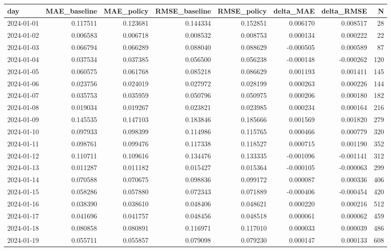 \begin{tabular}{lrrrrrrr}
\toprule
day & MAE_baseline & MAE_policy & RMSE_baseline & RMSE_policy & delta_MAE & delta_RMSE & N \\
\midrule
2024-01-01 & 0.117511 & 0.123681 & 0.144334 & 0.152851 & 0.006170 & 0.008517 & 28 \\
2024-01-02 & 0.006583 & 0.006718 & 0.008532 & 0.008753 & 0.000134 & 0.000222 & 22 \\
2024-01-03 & 0.066794 & 0.066289 & 0.088040 & 0.088629 & -0.000505 & 0.000589 & 87 \\
2024-01-04 & 0.037534 & 0.037385 & 0.056500 & 0.056238 & -0.000148 & -0.000262 & 120 \\
2024-01-05 & 0.060575 & 0.061768 & 0.085218 & 0.086629 & 0.001193 & 0.001411 & 145 \\
2024-01-06 & 0.023756 & 0.024019 & 0.027972 & 0.028199 & 0.000263 & 0.000226 & 144 \\
2024-01-07 & 0.035753 & 0.035959 & 0.050796 & 0.050975 & 0.000206 & 0.000180 & 182 \\
2024-01-08 & 0.019034 & 0.019267 & 0.023821 & 0.023985 & 0.000234 & 0.000164 & 216 \\
2024-01-09 & 0.145535 & 0.147103 & 0.183846 & 0.185666 & 0.001569 & 0.001820 & 279 \\
2024-01-10 & 0.097933 & 0.098399 & 0.114986 & 0.115765 & 0.000466 & 0.000779 & 320 \\
2024-01-11 & 0.098761 & 0.099476 & 0.117338 & 0.118527 & 0.000715 & 0.001190 & 352 \\
2024-01-12 & 0.110711 & 0.109616 & 0.134476 & 0.133335 & -0.001096 & -0.001141 & 312 \\
2024-01-13 & 0.011287 & 0.011182 & 0.015427 & 0.015364 & -0.000105 & -0.000063 & 299 \\
2024-01-14 & 0.070588 & 0.070675 & 0.098836 & 0.099172 & 0.000087 & 0.000336 & 406 \\
2024-01-15 & 0.058286 & 0.057880 & 0.072343 & 0.071889 & -0.000406 & -0.000454 & 420 \\
2024-01-16 & 0.038390 & 0.038610 & 0.048406 & 0.048621 & 0.000220 & 0.000216 & 512 \\
2024-01-17 & 0.041696 & 0.041757 & 0.048456 & 0.048518 & 0.000061 & 0.000062 & 459 \\
2024-01-18 & 0.080858 & 0.080891 & 0.116971 & 0.117010 & 0.000033 & 0.000039 & 486 \\
2024-01-19 & 0.055711 & 0.055857 & 0.079098 & 0.079230 & 0.000147 & 0.000133 & 608 \\

\end{tabular}

